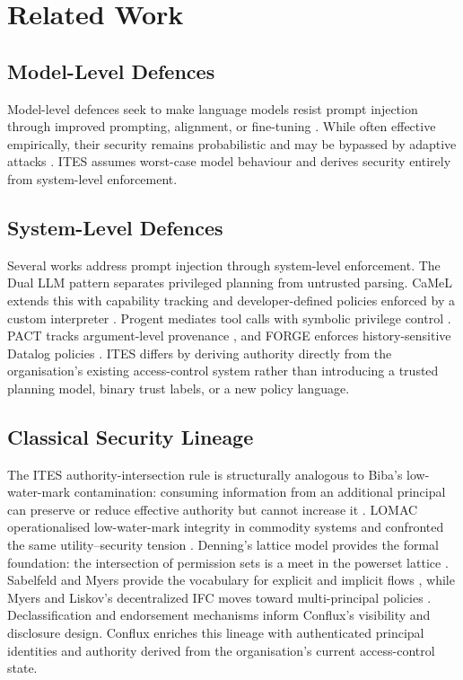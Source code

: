 \documentclass{article}
\begin{document}
\section{Related Work}

\subsection{Model-Level Defences}

Model-level defences seek to make language models resist prompt injection
through improved prompting, alignment, or fine-tuning
\citep{struq,spotlighting,secalign,datasentinel}. While often effective
empirically, their security remains probabilistic and may be bypassed by
adaptive attacks \citep{criticaleval,checkpointgcg,poisoningalignment}. ITES
assumes worst-case model behaviour and derives security entirely from
system-level enforcement.

\subsection{System-Level Defences}

Several works address prompt injection through system-level enforcement.
The Dual LLM pattern separates privileged planning from untrusted parsing.
CaMeL extends this with capability tracking and developer-defined policies
enforced by a custom interpreter \citep{camel,designpatterns}. Progent
mediates tool calls with symbolic privilege control \citep{progent}. PACT
tracks argument-level provenance \citep{pact}, and FORGE enforces
history-sensitive Datalog policies \citep{forge}. ITES differs by deriving
authority directly from the organisation's existing access-control system
rather than introducing a trusted planning model, binary trust labels, or
a new policy language.

\subsection{Classical Security Lineage}

The ITES authority-intersection rule is structurally analogous to Biba's
low-water-mark contamination: consuming information from an additional
principal can preserve or reduce effective authority but cannot increase it
\citep{biba1977}. LOMAC operationalised low-water-mark integrity in
commodity systems and confronted the same utility--security tension
\citep{lomac}. Denning's lattice model provides the formal foundation: the
intersection of permission sets is a meet in the powerset lattice
\citep{denning1976}. Sabelfeld and Myers provide the vocabulary for
explicit and implicit flows \citep{sabelfeld2003}, while Myers and Liskov's
decentralized IFC moves toward multi-principal policies
\citep{myersliskov}. Declassification and endorsement mechanisms
\citep{declassification-survey,robust-declassification,attacker-control,nonmalleable-ifc}
inform Conflux's visibility and disclosure design. Conflux enriches this
lineage with authenticated principal identities and authority derived from
the organisation's current access-control state.
\end{document}
